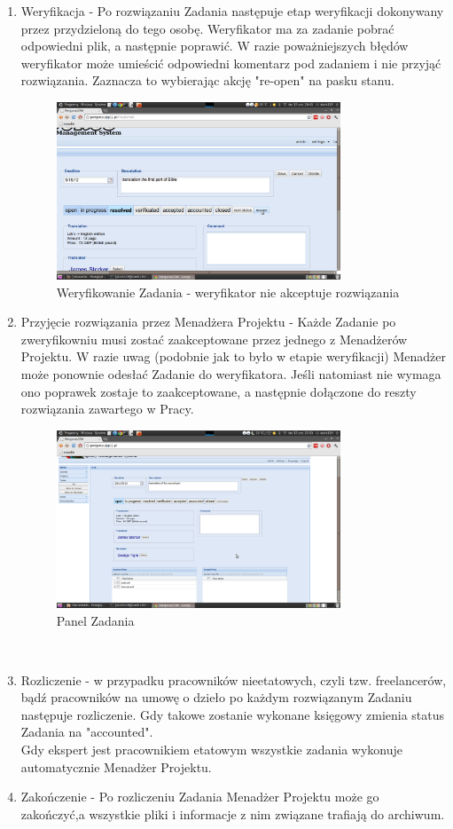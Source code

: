 \documentclass[licencjacka]{pracamgr}
\begin{document}
\begin{enumerate}
\item Weryfikacja - Po rozwiązaniu Zadania następuje etap weryfikacji dokonywany przez przydzieloną do tego osobę. Weryfikator ma za zadanie pobrać odpowiedni plik, a następnie poprawić. W razie poważniejszych błędów weryfikator może umieścić odpowiedni komentarz pod zadaniem i nie przyjąć rozwiązania. Zaznacza to wybierając akcję "re-open" na pasku stanu.	
\begin{figure}[h!]
\centering
\includegraphics[width=0.8\textwidth]{resources/task_reopen.png}
\caption{Weryfikowanie Zadania - weryfikator nie akceptuje rozwiązania}
\end{figure}
\item 	Przyjęcie rozwiązania przez Menadżera Projektu - Każde Zadanie po zweryfikowniu musi zostać zaakceptowane przez jednego z Menadżerów Projektu. W razie uwag (podobnie jak to było w etapie weryfikacji) Menadżer może ponownie odesłać Zadanie do weryfikatora. Jeśli natomiast nie wymaga ono poprawek zostaje to zaakceptowane, a następnie dołączone do reszty rozwiązania zawartego w Pracy.
\begin{figure}[h!]
\centering
\includegraphics[width=0.8\textwidth]{resources/task.png}
\caption{Panel Zadania}
\end{figure}
\\
\item Rozliczenie - w przypadku pracowników nieetatowych, czyli tzw. freelancerów, bądź pracowników na umowę o dzieło po każdym rozwiązanym Zadaniu następuje rozliczenie. Gdy takowe zostanie wykonane księgowy zmienia status Zadania na "accounted".\\
Gdy ekspert jest pracownikiem etatowym wszystkie zadania wykonuje automatycznie Menadżer Projektu.
\item Zakończenie - Po rozliczeniu Zadania Menadżer Projektu może go zakończyć,a wszystkie pliki i informacje z nim związane trafiają do archiwum. 
\end{enumerate}
\end{document}
